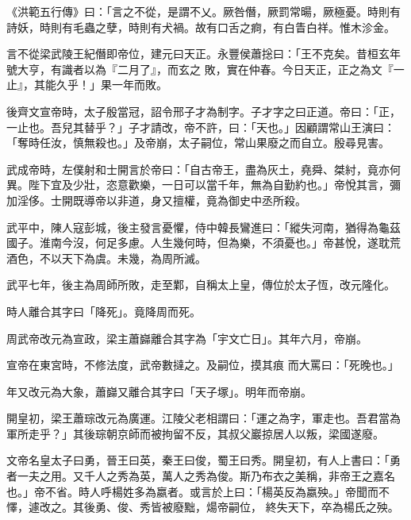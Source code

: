 \begin{pinyinscope}
 《洪範五行傳》曰：「言之不從，是謂不乂。厥咎僭，厥罰常暘，厥極憂。時則有詩妖，時則有毛蟲之孽，時則有犬禍。故有口舌之痾，有白眚白祥。惟木沴金。



 言不從梁武陵王紀僭即帝位，建元曰天正。永豐侯蕭捴曰：「王不克矣。昔桓玄年號大亨，有識者以為『二月了』，而玄之
 敗，實在仲春。今日天正，正之為文『一止』，其能久乎！」果一年而敗。



 後齊文宣帝時，太子殷當冠，詔令邢子才為制字。子才字之曰正道。帝曰：「正，一止也。吾兒其替乎？」子才請改，帝不許，曰：「天也。」因顧謂常山王演曰：「奪時任汝，慎無殺也。」及帝崩，太子嗣位，常山果廢之而自立。殷尋見害。



 武成帝時，左僕射和士開言於帝曰：「自古帝王，盡為灰土，堯舜、桀紂，竟亦何異。陛下宜及少壯，恣意歡樂，一日可以當千年，無為自勤約也。」帝悅其言，彌加淫侈。士開既導帝以非道，身又擅權，竟為御史中丞所殺。



 武平中，陳人寇彭城，後主發言憂懼，侍中韓長鸞進曰：「縱失河南，猶得為龜茲國子。淮南今沒，何足多慮。人生幾何時，但為樂，不須憂也。」帝甚悅，遂耽荒酒色，不以天下為虞。未幾，為周所滅。



 武平七年，後主為周師所敗，走至鄴，自稱太上皇，傳位於太子恆，改元隆化。



 時人離合其字曰「降死」。竟降周而死。



 周武帝改元為宣政，梁主蕭巋離合其字為「宇文亡日」。其年六月，帝崩。



 宣帝在東宮時，不修法度，武帝數撻之。及嗣位，摸其痕
 而大罵曰：「死晚也。」



 年又改元為大象，蕭巋又離合其字曰「天子塚」。明年而帝崩。



 開皇初，梁王蕭琮改元為廣運。江陵父老相謂曰：「運之為字，軍走也。吾君當為軍所走乎？」其後琮朝京師而被拘留不反，其叔父巖掠居人以叛，梁國遂廢。



 文帝名皇太子曰勇，晉王曰英，秦王曰俊，蜀王曰秀。開皇初，有人上書曰：「勇者一夫之用。又千人之秀為英，萬人之秀為俊。斯乃布衣之美稱，非帝王之嘉名也。」帝不省。時人呼楊姓多為嬴者。或言於上曰：「楊英反為嬴殃。」帝聞而不懌，遽改之。其後勇、俊、秀皆被廢黜，煬帝嗣位，
 終失天下，卒為楊氏之殃。




\end{pinyinscope}
